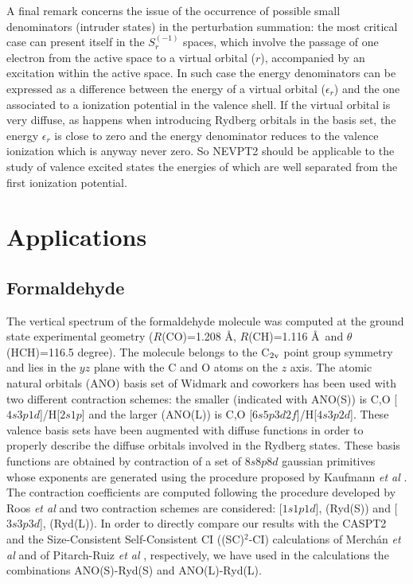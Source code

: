 \documentclass[global,referee]{svjour}
\newcommand{\pertusp}[2]{S_{#1}^{({#2})}}
\begin{document}
A final remark concerns the issue of the occurrence of possible small
denominators (intruder states) in the perturbation summation: the most
critical case can present itself in the $\pertusp{r}{-1}$ spaces,
which involve the passage of one electron from the active space to a
virtual orbital ($r$), accompanied by an excitation within the active
space. In such case the energy denominators can be expressed as a
difference between the energy of a virtual orbital ($\epsilon_r$) and
the one associated to a ionization potential in the valence shell. If
the virtual orbital is very diffuse, as happens when introducing
Rydberg orbitals in the basis set, the energy $\epsilon_r$ is close to
zero and the energy denominator reduces to the valence ionization
which is anyway never zero. So NEVPT2 should be applicable to the
study of valence excited states the energies of which are well
separated from the first ionization potential.



\section{Applications\label{sect3}}

\subsection{Formaldehyde}
\label{formsec}

The vertical spectrum of the formaldehyde molecule was computed at the ground state 
experimental geometry \cite{Nelson65} ($R$(CO)=1.208 \AA, $R$(CH)=1.116 \AA\ 
and $\theta$(HCH)=116.5 degree). The molecule belongs to the C$_{\rm 2v}$ point group symmetry and
lies in the $yz$ plane with the C and O atoms on the $z$ axis.  The atomic natural orbitals (ANO) basis set
of Widmark and coworkers \cite{Widma90} has been used with two different contraction schemes:
the smaller (indicated with ANO(S)) is C,O [$4s3p1d$]/H[$2s1p$] and the larger (ANO(L)) is 
C,O [$6s5p3d2f$]/H[$4s3p2d$]. 
These valence basis sets have been augmented with diffuse functions in order to properly describe
the diffuse orbitals involved in the Rydberg states. These basis functions are obtained by contraction
of a set of $8s8p8d$ gaussian primitives whose exponents are generated using the procedure proposed by 
Kaufmann {\it et al} \cite{Kaufm89}. The contraction coefficients are computed following the procedure
developed by  Roos {\it et al} \cite{Roos95} and two contraction schemes are considered: 
[$1s1p1d$], (Ryd(S)) and [$3s3p3d$], (Ryd(L)).
In order to directly compare our
results with the CASPT2 and the Size-Consistent Self-Consistent CI 
((SC)$^2$-CI) calculations of Merch\'an {\it et al} \cite{Merch95} and 
of Pit\-arch-Ruiz {\it et al} \cite{Ruiz03}, respectively,  we have used in the calculations the 
combinations ANO(S)-Ryd(S) and ANO(L)-Ryd(L).
\end{document}
